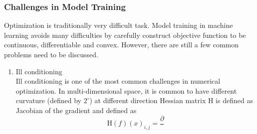 \subsubsection{Challenges in Model Training}

Optimization is traditionally very difficult task. Model training in machine learning avoids many difficulties by carefully construct objective function to be continuous, differentiable and convex. However, there are still a few common problems need to be discussed. 

\begin{enumerate}
    \item Ill conditioning\\
Ill conditioning is one of the most common challenges in numerical optimization. In multi-dimensional space, it is common to have different curvature (defined by $2^\circ$) at different direction
Hessian matrix $\mathrm{H}$ is defined as Jacobian of the gradient and defined as 
\begin{equation}
    \mathrm{H}(f)(x)_{i,j} = \frac{\partial}{}
\end{equation}
\end{enumerate}

